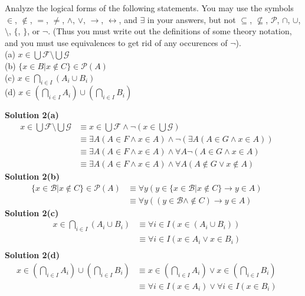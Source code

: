 \begin{tcolorbox}[title=Problem 2, breakable]
    Analyze the logical forms of the following statements. You may use the symbols
    $\in$, $\not \in$, $=$, $\not =$, $\wedge$, $\vee$, $\rightarrow$,
    $\leftrightarrow$, and $\exists$ in your answers, but not
    $\subseteq$, $\not \subseteq$,  $\mathcal{P}$, $\cap$, $\cup$,
    $\setminus$, $\{$, $\}$, or $\neg$. (Thus you must write out the definitions of some
    theory notation, and you must use equivalences to get rid of any occurences
    of $\neg$). \\
    (a) $x \in \bigcup \mathcal{F} \setminus \bigcup \mathcal{G}$ \\
    (b) $\{x \in B | x \not \in C\} \in \mathcal{P}(A)$ \\
    (c) $x \in \bigcap_{i \in I}(A_i \cup B_i)$ \\
    (d) $x \in (\bigcap_{i \in I} A_i) \cup (\bigcap_{i \in I} B_i)$
\end{tcolorbox}

\textbf{Solution 2(a)} \\
    \begin{align*}
        x \in\bigcup\mathcal{F} \setminus\bigcup\mathcal{G}
            &\equiv x \in \bigcup\mathcal{F} \wedge \neg\left(x \in \bigcup \mathcal{G}\right) && \\
        &\equiv \exists{A}(A \in F \wedge x \in A) \wedge \neg(\exists{A}(A \in G \wedge x \in A)) && \\
        &\equiv \exists{A}(A \in F \wedge x \in A) \wedge \forall{A}\neg(A \in G \wedge x \in A) && \\
        &\equiv \exists{A}(A \in F \wedge x \in A) \wedge \forall{A}(A \not \in G \vee x \not \in A)
    \end{align*}
\textbf{Solution 2(b)} \\
    \begin{align*}
        \{x \in \mathcal{B} | x \not \in C\} \in \mathcal{P}(A)
            &\equiv \forall{y}(y \in \{x \in \mathcal{B} | x \not \in C\} \rightarrow y \in A) && \\
        &\equiv \forall{y}((y \in\mathcal{B} \wedge \not\in C) \rightarrow y \in A) &&
    \end{align*}
\textbf{Solution 2(c)} \\
    \begin{align*}
        x \in \bigcap_{i \in I}(A_i \cup B_i) 
            &\equiv \forall{i \in I}(x \in (A_i \cup B_i)) && \\
        &\equiv \forall{i \in I}(x \in A_i \vee x \in B_i) && \\
    \end{align*}
\textbf{Solution 2(d)} \\
    \begin{align*}
        x \in \left(\bigcap_{i \in I} A_i\right) \cup \left(\bigcap_{i \in I} B_i\right)
            &\equiv x \in \left(\bigcap_{i \in I} A_i\right) \vee x \in \left(\bigcap_{i \in I} B_i\right) && \\
        &\equiv \forall{i \in I}(x \in A_i) \vee \forall{i \in I}(x \in B_i) && \\
    \end{align*}

